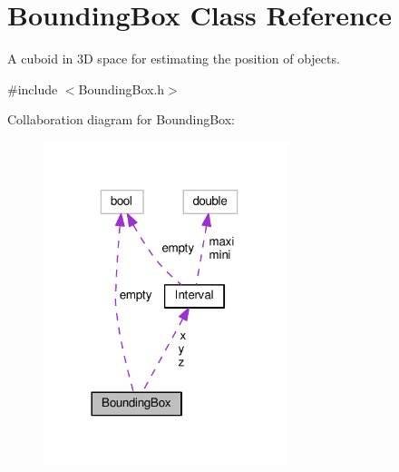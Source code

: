 \hypertarget{classBoundingBox}{}\section{Bounding\+Box Class Reference}
\label{classBoundingBox}


A cuboid in 3D space for estimating the position of objects.  




{\ttfamily \#include $<$Bounding\+Box.\+h$>$}



Collaboration diagram for Bounding\+Box\+:\nopagebreak
\begin{figure}[H]
\begin{center}
\leavevmode
\includegraphics[width=201pt]{classBoundingBox__coll__graph}
\end{center}
\end{figure}
